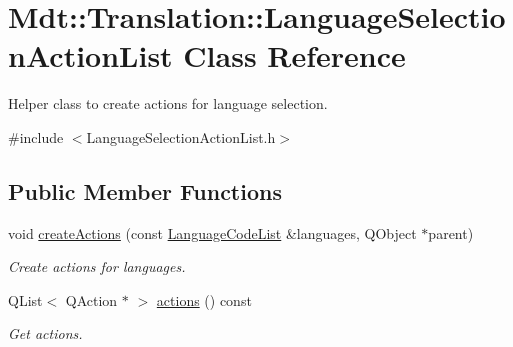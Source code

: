 \hypertarget{class_mdt_1_1_translation_1_1_language_selection_action_list}{}\section{Mdt\+:\+:Translation\+:\+:Language\+Selection\+Action\+List Class Reference}
\label{class_mdt_1_1_translation_1_1_language_selection_action_list}


Helper class to create actions for language selection.  




{\ttfamily \#include $<$Language\+Selection\+Action\+List.\+h$>$}

\subsection*{Public Member Functions}
\begin{DoxyCompactItemize}
\item 
void \hyperlink{class_mdt_1_1_translation_1_1_language_selection_action_list_a47e452c3448e9b605082b419fca2bc76}{create\+Actions} (const \hyperlink{class_mdt_1_1_translation_1_1_language_code_list}{Language\+Code\+List} \&languages, Q\+Object $\ast$parent)\hypertarget{class_mdt_1_1_translation_1_1_language_selection_action_list_a47e452c3448e9b605082b419fca2bc76}{}\label{class_mdt_1_1_translation_1_1_language_selection_action_list_a47e452c3448e9b605082b419fca2bc76}

\begin{DoxyCompactList}\small\item\em Create actions for {\itshape languages}. \end{DoxyCompactList}\item 
Q\+List$<$ Q\+Action $\ast$ $>$ \hyperlink{class_mdt_1_1_translation_1_1_language_selection_action_list_aa2af505b402918e786a2bf0ea9344dd7}{actions} () const \hypertarget{class_mdt_1_1_translation_1_1_language_selection_action_list_aa2af505b402918e786a2bf0ea9344dd7}{}\label{class_mdt_1_1_translation_1_1_language_selection_action_list_aa2af505b402918e786a2bf0ea9344dd7}

\begin{DoxyCompactList}\small\item\em Get actions. \end{DoxyCompactList}\end{DoxyCompactItemize}


